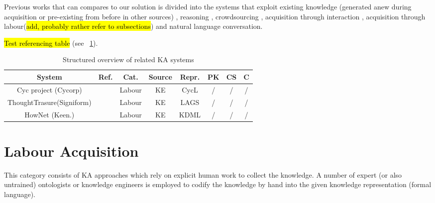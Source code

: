 Previous works that can compares to our solution is divided into the systems that exploit existing knowledge (generated anew during acquisition or pre-existing from before in other sources) \parencite{Singh2002a,Witbrock2003,Forbus2007,Kvo2010,Sharma2010,Mitchel2015}, reasoning \parencite{Witbrock2003,Speer2007,Speer2008,Kuo2010}, crowdsourcing \parencite{Singh2002,Speer2009, Kuo2010, Pedro2012a, Pedro2013}, acquisition through interaction \parencite{Speer2009,Pedro2012,Pedro2013}, acquisition through labour(\hl{add, probably rather refer to subsections}) \parencite{} and natural language conversation\parencite{Pedro2012, Speer2007,Speer2009, Witbrock2003,Kuo2010}.

\hl{Test referencing table} (see \tablename~\ref{tab:related}).

\begin{table}[htb]
	\caption{Structured overview of related KA systems}
	\label{tab:related}
	\centering
	\begin{tabular}{cccccccc}
		\hline
		System & Ref. & Cat. & Source & Repr. & PK &  CS & C \\
		\hline
		Cyc project (Cycorp) & \parencite{Lenat1995} & Labour & KE & CycL & / & / & / \\
		ThoughtTrasure(Signiform) & \parencite{Mueller2003} & Labour & KE & LAGS & / & / & / \\
		HowNet (Keen.) & \parencite{Lenat1995} & Labour & KE & KDML & / & / & / \\
		\hline
	\end{tabular}
\end{table}

\section{Labour Acquisition}
This category consists of KA approaches which rely on explicit human work to collect the knowledge. A number of expert (or also untrained) ontologists or knowledge engineers is employed to codify the knowledge by hand into the given knowledge representation (formal language). 

